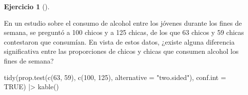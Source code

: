 \documentclass[
  spanish,
  a4paper,
]{scrreport}
\newenvironment{Shaded}{\begin{snugshade}}{\end{snugshade}}
\newcommand{\AttributeTok}[1]{\textcolor[rgb]{0.40,0.45,0.13}{#1}}
\newcommand{\ConstantTok}[1]{\textcolor[rgb]{0.56,0.35,0.01}{#1}}
\newcommand{\DecValTok}[1]{\textcolor[rgb]{0.68,0.00,0.00}{#1}}
\newcommand{\FunctionTok}[1]{\textcolor[rgb]{0.28,0.35,0.67}{#1}}
\newcommand{\NormalTok}[1]{\textcolor[rgb]{0.00,0.23,0.31}{#1}}
\newcommand{\SpecialCharTok}[1]{\textcolor[rgb]{0.37,0.37,0.37}{#1}}
\newcommand{\StringTok}[1]{\textcolor[rgb]{0.13,0.47,0.30}{#1}}
\theoremstyle{definition}
\newtheorem{exercise}{Ejercicio}[chapter]
\theoremstyle{remark}
\begin{document}
\begin{exercise}[]\protect\hypertarget{exr-contraste-proporcion-consumo-alcohol}{}\label{exr-contraste-proporcion-consumo-alcohol}

En un estudio sobre el consumo de alcohol entre los jóvenes durante los
fines de semana, se preguntó a 100 chicos y a 125 chicas, de los que 63
chicos y 59 chicas contestaron que consumían. En vista de estos datos,
¿existe alguna diferencia significativa entre las proporciones de chicos
y chicas que consumen alcohol los fines de semana?

\end{exercise}

\begin{tcolorbox}[enhanced jigsaw, arc=.35mm, bottomrule=.15mm, bottomtitle=1mm, breakable, colback=white, colbacktitle=quarto-callout-tip-color!10!white, colframe=quarto-callout-tip-color-frame, coltitle=black, left=2mm, leftrule=.75mm, opacityback=0, opacitybacktitle=0.6, rightrule=.15mm, title=\textcolor{quarto-callout-tip-color}{\faLightbulb}\hspace{0.5em}{Solución}, titlerule=0mm, toprule=.15mm, toptitle=1mm]

\begin{Shaded}
\begin{Highlighting}[]
\FunctionTok{tidy}\NormalTok{(}\FunctionTok{prop.test}\NormalTok{(}\FunctionTok{c}\NormalTok{(}\DecValTok{63}\NormalTok{, }\DecValTok{59}\NormalTok{), }\FunctionTok{c}\NormalTok{(}\DecValTok{100}\NormalTok{, }\DecValTok{125}\NormalTok{), }\AttributeTok{alternative =} \StringTok{"two.sided"}\NormalTok{), }\AttributeTok{conf.int =} \ConstantTok{TRUE}\NormalTok{) }\SpecialCharTok{|\textgreater{}} 
    \FunctionTok{kable}\NormalTok{()}
\end{Highlighting}
\end{Shaded}


\end{tcolorbox}
\end{document}
